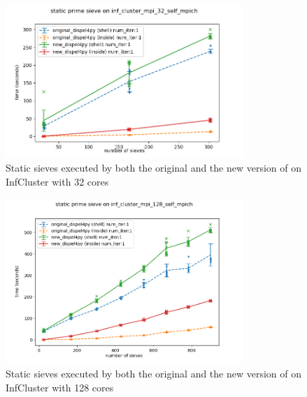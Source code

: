 \begin{figure}[h]
\centering
    \includegraphics[width=0.8\textwidth]{figures/sieve_static_32}
\caption{Static sieves executed by both the original and the new version of \dpy on InfCluster with 32 cores}
\label{fig:sieve_static_32}
\end{figure}

\begin{figure}[h]
\centering
    \includegraphics[width=0.8\textwidth]{figures/sieve_static_128}
\caption{Static sieves executed by both the original and the new version of \dpy on InfCluster with 128 cores}
\label{fig:sieve_static_128}
\end{figure}

